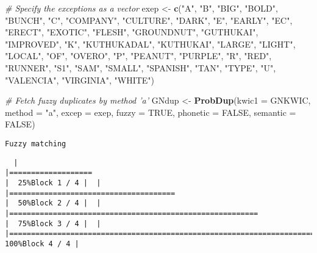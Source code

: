\documentclass[
]{article}
\newenvironment{Shaded}{\begin{snugshade}}{\end{snugshade}}
\newcommand{\CommentTok}[1]{\textcolor[rgb]{0.56,0.35,0.01}{\textit{#1}}}
\newcommand{\DataTypeTok}[1]{\textcolor[rgb]{0.13,0.29,0.53}{#1}}
\newcommand{\KeywordTok}[1]{\textcolor[rgb]{0.13,0.29,0.53}{\textbf{#1}}}
\newcommand{\NormalTok}[1]{#1}
\newcommand{\OtherTok}[1]{\textcolor[rgb]{0.56,0.35,0.01}{#1}}
\newcommand{\StringTok}[1]{\textcolor[rgb]{0.31,0.60,0.02}{#1}}
\begin{document}
\begin{Shaded}
\begin{Highlighting}[]
\CommentTok{# Specify the exceptions as a vector}
\NormalTok{exep <-}\StringTok{ }\KeywordTok{c}\NormalTok{(}\StringTok{"A"}\NormalTok{, }\StringTok{"B"}\NormalTok{, }\StringTok{"BIG"}\NormalTok{, }\StringTok{"BOLD"}\NormalTok{, }\StringTok{"BUNCH"}\NormalTok{, }\StringTok{"C"}\NormalTok{, }\StringTok{"COMPANY"}\NormalTok{, }\StringTok{"CULTURE"}\NormalTok{,}
         \StringTok{"DARK"}\NormalTok{, }\StringTok{"E"}\NormalTok{, }\StringTok{"EARLY"}\NormalTok{, }\StringTok{"EC"}\NormalTok{, }\StringTok{"ERECT"}\NormalTok{, }\StringTok{"EXOTIC"}\NormalTok{, }\StringTok{"FLESH"}\NormalTok{, }\StringTok{"GROUNDNUT"}\NormalTok{,}
         \StringTok{"GUTHUKAI"}\NormalTok{, }\StringTok{"IMPROVED"}\NormalTok{, }\StringTok{"K"}\NormalTok{, }\StringTok{"KUTHUKADAL"}\NormalTok{, }\StringTok{"KUTHUKAI"}\NormalTok{, }\StringTok{"LARGE"}\NormalTok{,}
         \StringTok{"LIGHT"}\NormalTok{, }\StringTok{"LOCAL"}\NormalTok{, }\StringTok{"OF"}\NormalTok{, }\StringTok{"OVERO"}\NormalTok{, }\StringTok{"P"}\NormalTok{, }\StringTok{"PEANUT"}\NormalTok{, }\StringTok{"PURPLE"}\NormalTok{, }\StringTok{"R"}\NormalTok{,}
         \StringTok{"RED"}\NormalTok{, }\StringTok{"RUNNER"}\NormalTok{, }\StringTok{"S1"}\NormalTok{, }\StringTok{"SAM"}\NormalTok{, }\StringTok{"SMALL"}\NormalTok{, }\StringTok{"SPANISH"}\NormalTok{, }\StringTok{"TAN"}\NormalTok{, }\StringTok{"TYPE"}\NormalTok{,}
         \StringTok{"U"}\NormalTok{, }\StringTok{"VALENCIA"}\NormalTok{, }\StringTok{"VIRGINIA"}\NormalTok{, }\StringTok{"WHITE"}\NormalTok{)}

\CommentTok{# Fetch fuzzy duplicates by method 'a'}
\NormalTok{GNdup <-}\StringTok{ }\KeywordTok{ProbDup}\NormalTok{(}\DataTypeTok{kwic1 =}\NormalTok{ GNKWIC, }\DataTypeTok{method =} \StringTok{"a"}\NormalTok{, }\DataTypeTok{excep =}\NormalTok{ exep, }\DataTypeTok{fuzzy =} \OtherTok{TRUE}\NormalTok{,}
                 \DataTypeTok{phonetic =} \OtherTok{FALSE}\NormalTok{, }\DataTypeTok{semantic =} \OtherTok{FALSE}\NormalTok{)}
\end{Highlighting}
\end{Shaded}

\begin{verbatim}
Fuzzy matching
\end{verbatim}

\begin{verbatim}
  |                                                                                    |===================                                                         |  25%Block 1 / 4 |  |                                                                                    |======================================                                      |  50%Block 2 / 4 |  |                                                                                    |=========================================================                   |  75%Block 3 / 4 |  |                                                                                    |============================================================================| 100%Block 4 / 4 |
\end{verbatim}
\end{document}
